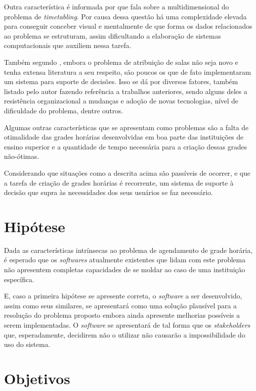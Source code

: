 Outra característica é informada por  que fala sobre a multidimensional do problema de \textit{timetabling}. Por causa dessa questão há uma complexidade elevada para conseguir conceber visual e mentalmente de que forma os dados relacionados ao problema se estruturam, assim dificultando a elaboração de sistemas computacionais que auxiliem nessa tarefa.

Também segundo , embora o problema de atribuição de salas não seja novo e tenha extensa literatura a seu respeito, são poucos os que de fato implementaram um sistema para suporte de decisões. Isso se dá por diversos fatores, também listado pelo autor fazendo referência a trabalhos anteriores, sendo alguns deles a resistência organizacional a mudanças e adoção de novas tecnologias, nível de dificuldade do problema, dentre outros.

Algumas outras características que se apresentam como problemas são a falta de otimalidade das grades horárias desenvolvidas em boa parte das instituições de ensino superior e a quantidade de tempo necessária para a criação dessas grades não-ótimas.

Considerando que situações como a descrita acima são passíveis de ocorrer, e que a tarefa de criação de grades horárias é recorrente, um sistema de suporte à decisão que supra às necessidades dos seus usuários se faz necessário.

\section{Hipótese} \label{sec:Hipótese}                  %

Dada as características intrínsecas ao problema de agendamento de grade horária, é esperado que os \textit{softwares} atualmente existentes que lidam com este problema não apresentem completas capacidades de se moldar ao caso de uma instituição específica.

E, caso a primeira hipótese se apresente correta, o \textit{software} a ser desenvolvido, assim como seus similares, se apresentará como uma solução plausível para a resolução do problema proposto embora ainda apresente melhorias possíveis a serem implementadas. O \textit{software} se apresentará de tal forma que os \textit{stakeholders} que, esperadamente, decidirem não o utilizar não causarão a impossibilidade do uso do sistema.

\section{Objetivos} \label{sec:Objetivos}                %

